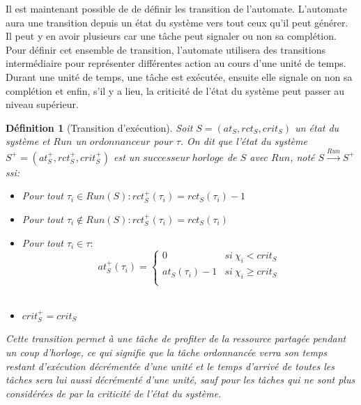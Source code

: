 \documentclass[11pt,a4paper,oneside]{book}
\theoremstyle{break}
\newtheorem{defin}{Définition}
\theoremstyle{breakplain}
\begin{document}
Il est maintenant possible de de définir les transition de l'automate. L'automate aura une transition depuis un état du système vers tout ceux qu'il peut générer. Il peut y en avoir plusieurs car une tâche peut signaler ou non sa complétion.\\
Pour définir cet ensemble de transition, l'automate utilisera des transitions intermédiaire pour représenter différentes action au cours d'une unité de temps.\\

Durant une unité de temps, une tâche est exécutée, ensuite elle signale on non sa complétion et enfin, s'il y a lieu, la criticité de l'état du système peut passer  au niveau supérieur.

\begin{defin}[Transition d'exécution]
Soit $S = (at_S, rct_S, crit_S)$ un état du système et $Run$ un $ordonnanceur$ pour $\tau$. On dit que l'état du système $S^+ = (at_S^+, rct_S^+, crit_S^+)$ est un $successeur\ horloge$ de $S$ avec $Run$, noté $S\xrightarrow{Run}S^+$ ssi:
\begin{itemize}
\item Pour tout $\tau_i \in Run(S) : rct_S^+(\tau_i) = rct_S(\tau_i)-1$\\
\item Pour tout $\tau_i \not \in Run(S) : rct_S^+(\tau_i) = rct_S(\tau_i)$\\
\item Pour tout $\tau_i \in \tau :$
$$ at_S^+(\tau_i) = \left\{
    \begin{array}{ll}
        0 & si\ \chi_i < crit_S \\
        at_S(\tau_i)-1 & si\ \chi_i \geq crit_S \\
    \end{array}
\right.
$$\\
\item $crit_{S}^{+} = crit_{S}$

\end{itemize}
Cette transition permet à une tâche de profiter de la ressource partagée pendant un coup d'horloge, ce qui signifie que la tâche ordonnancée verra son temps restant d'exécution décrémentée d'une unité et le temps d'arrivé de toutes les tâches sera lui aussi décrémenté d'une unité, sauf pour les tâches qui ne sont plus considérées de par la criticité de l'état du système.
\end{defin}
\end{document}
